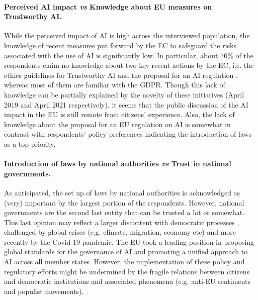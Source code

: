 \documentclass{article}
\begin{document}
\paragraph{\textbf{Perceived AI impact \emph{vs} Knowledge about EU measures on Trustworthy AI}.}
While the perceived impact of AI is high across the interviewed population, the knowledge of recent measures put forward by the EC to safeguard the risks associated with the use of AI is significantly low. In particular, about 70\% of the respondents claim no knowledge about two key recent actions by the EC, i.e. the ethics guidelines for Trustworthy AI \cite{Trustworthy_EU} and the proposal for an AI regulation \cite{ai_act}, whereas most of them are familiar with the GDPR. Though this lack of knowledge can be partially explained by the novelty of these initiatives (April 2019 and April 2021 respectively), it seems that the public discussion of the AI impact in the EU is still remote from citizens' experience. Also, the lack of knowledge about the proposal for an EU regulation on AI is somewhat in contrast with respondents' policy preferences indicating the introduction of laws as a top priority. 

\paragraph{\textbf{Introduction of laws by national authorities \emph{vs} Trust in national governments}.}
As anticipated, the set up of laws by national authorities is acknowledged as (very) important by the largest portion of the respondents. However, national governments are the second last entity that can be trusted a lot or somewhat. This last opinion may reflect a larger discontent with democratic processes \cite{Cordis}, challenged by global crises (e.g. climate, migration, economy etc) and more recently by the Covid-19 pandemic. The EU took a leading position in proposing global standards for the governance of AI and promoting a unified approach to AI across all member states. However, the implementation of these policy and regulatory efforts might be undermined by the fragile relations between citizens and democratic institutions and associated phenomena (e.g. anti-EU sentiments and populist movements).
\end{document}
